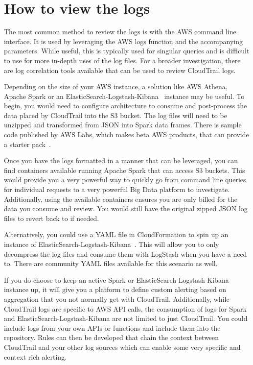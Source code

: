 \section{How to view the logs}

The most common method to review the logs is with the AWS command line interface. 
It is used by leveraging the AWS logs function and the accompanying parameters.
While useful, this is typically used for singular queries and is difficult to
use for more in-depth uses of the log files. For a broader investigation, there
are log correlation tools available that can be used to review CloudTrail logs.

Depending on the size of your AWS instance, a solution like AWS Athena, Apache 
Spark or an ElasticSearch-Logstash-Kibana~\cite{hid-sp18-518-CloudTrail-ELK} 
instance may be useful. To begin, you would need to configure architecture to 
consume and post-process the data placed by CloudTrail into the S3 bucket. The 
log files will need to be unzipped and transformed from JSON into Spark data 
frames. There is sample code published by AWS Labs, which makes beta AWS 
products, that can provide a starter pack~\cite{hid-sp18-518-CloudTrail-timely}.

Once you have the logs formatted in a manner that can be leveraged, you can
find containers available running Apache Spark that can access S3 buckets. This
would provide you a very powerful way to quickly go from command line queries
for individual requests to a very powerful Big Data platform to investigate. 
Additionally, using the available containers ensures you are only billed for
the data you consume and review. You would still have the original zipped JSON
log files to revert back to if needed.

Alternatively, you could use a YAML file in CloudFormation to spin up an 
instance of ElasticSearch-Logstash-Kibana~\cite{hid-sp18-518-CloudTrail-ELK}. 
This will allow you to only decompress the log files and consume them with 
LogStash when you have a need to. There are community YAML files available
for this scenario as well.

If you do choose to keep an active Spark or ElasticSearch-Logstash-Kibana
instance up, it will give you a platform to define custom alerting based on
aggregation that you not normally get with CloudTrail. Additionally, while
CloudTrail logs are specific to AWS API calls, the consumption of logs for
Spark and ElasticSearch-Logstash-Kibana are not limited to just CloudTrail.
You could include logs from your own APIs or functions and include them into
the repository. Rules can then be developed that chain the context between 
CloudTrail and your other log sources which can enable some very specific
and context rich alerting.

